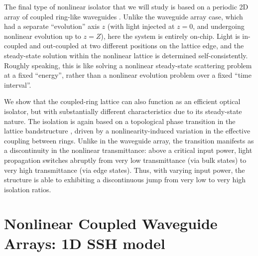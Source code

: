 \documentclass[aps,prx,twocolumn,superscriptaddress]{revtex4-1}
\begin{document}
The final type of nonlinear isolator that we will study is based on a periodic 2D array of coupled ring-like waveguides \cite{hafezi2011nphy,hafezi2014,liang2013,liang2014,Pasek2014,Hu2015,Fei2016}.  Unlike the waveguide array case, which had a separate ``evolution'' axis $z$ (with light injected at $z=0$, and undergoing nonlinear evolution up to $z=Z$), here the system is entirely on-chip.  Light is in-coupled and out-coupled at two different positions on the lattice edge, and the steady-state solution within the nonlinear lattice is determined self-consistently.  Roughly speaking, this is like solving a nonlinear steady-state scattering problem at a fixed ``energy'', rather than a nonlinear evolution problem over a fixed ``time interval''.

We show that the coupled-ring lattice can also function as an efficient optical isolator, but with substantially different characteristics due to its steady-state nature.  The isolation is again based on a topological phase transition in the lattice bandstructure \cite{liang2013,Pasek2014}, driven by a nonlinearity-induced variation in the effective coupling between rings.  Unlike in the waveguide array, the transition manifests as a discontinuity in the nonlinear transmittance: above a critical input power, light propagation switches abruptly from very low transmittance (via bulk states) to very high transmittance (via edge states).  Thus, with varying input power, the structure is able to exhibiting a discontinuous jump from very low to very high isolation ratios.

\section{Nonlinear Coupled Waveguide Arrays: 1D SSH model}
\label{sec:array1d}
\end{document}
